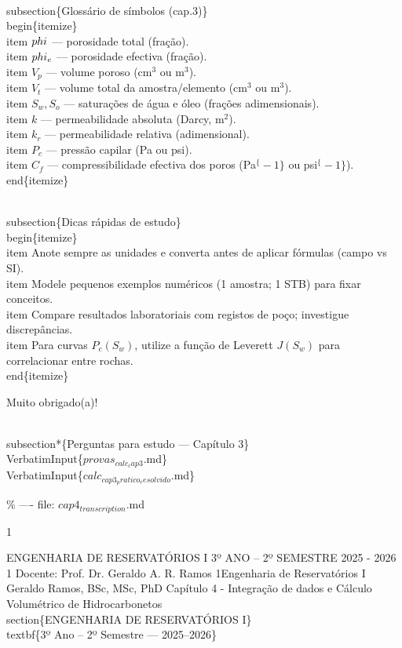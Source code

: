 \documentclass[11pt,a4paper]{article}
\begin{document}
\begin{enumerate}
{\\subsection\{Glossário de símbolos (cap.3)\}
\\begin\{itemize\}
\\item $\\phi$ — porosidade total (fração).
\\item $\\phi_e$ — porosidade efectiva (fração).
\\item $V_p$ — volume poroso (cm$^3$ ou m$^3$).
\\item $V_t$ — volume total da amostra/elemento (cm$^3$ ou m$^3$).
\\item $S_w, S_o$ — saturações de água e óleo (frações adimensionais).
\\item $k$ — permeabilidade absoluta (Darcy, m$^2$).
\\item $k_r$ — permeabilidade relativa (adimensional).
\\item $P_c$ — pressão capilar (Pa ou psi).
\\item $C_f$ — compressibilidade efectiva dos poros (Pa$^\{-1\}$ ou psi$^\{-1\}$).
\\end\{itemize\}

\\subsection\{Dicas rápidas de estudo\}
\\begin\{itemize\}
\\item Anote sempre as unidades e converta antes de aplicar fórmulas (campo vs SI).
\\item Modele pequenos exemplos numéricos (1 amostra; 1 STB) para fixar conceitos.
\\item Compare resultados laboratoriais com registos de poço; investigue discrepâncias.
\\item Para curvas $P_c(S_w)$, utilize a função de Leverett $J(S_w)$ para correlacionar entre rochas.
\\end\{itemize\}


Muito obrigado(a)!

\\subsection*\{Perguntas para estudo --- Capítulo 3\}
\\VerbatimInput\{$provas_{calc_cap3}$.md\}
\\VerbatimInput\{$calc_{cap3_pratico_resolvido}$.md\}

\% ---- file: $cap4_{transcription}$.md



1



ENGENHARIA DE RESERVATÓRIOS I
3º ANO – 2º SEMESTRE
2025 - 2026
1
Docente: Prof. Dr. Geraldo A. R. Ramos
1Engenharia de Reservatórios I
Geraldo Ramos, BSc, MSc, PhD
Capítulo 4 - Integração de dados e Cálculo Volumétrico de Hidrocarbonetos
\\section\{ENGENHARIA DE RESERVATÓRIOS I\}
 \\textbf\{3º Ano – 2º Semestre — 2025–2026\}

}
\end{enumerate}
\end{document}
